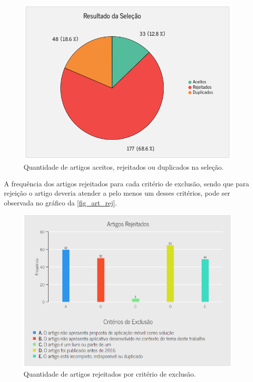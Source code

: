 \begin{figure}[htb]
  \caption{\label{fig_res_sel}Quantidade de artigos aceitos, rejeitados ou duplicados na seleção.}
  \begin{center}
    \includegraphics[scale=0.825]{Imagens/msl/resultado_selecao.png}
  \end{center}
\end{figure}

\newpage

A frequência dos artigos rejeitados para cada critério de exclusão, sendo que para rejeição o artigo deveria atender a
pelo menos um desses critérios, pode ser observada no gráfico da \autoref{fig_art_rej}.

\begin{figure}[htb]
  \caption{\label{fig_art_rej}Quantidade de artigos rejeitados por critério de exclusão.}
  \begin{center}
    \includegraphics[scale=0.8]{Imagens/msl/artigos_rejeitados.png}
  \end{center}
\end{figure}

